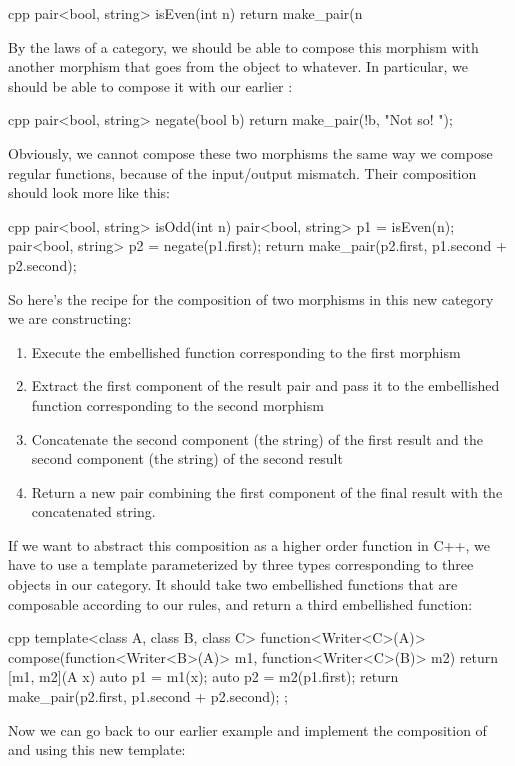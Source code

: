 \begin{snip}{cpp}
pair<bool, string> isEven(int n) {
    return make_pair(n %
}
\end{snip}
By the laws of a category, we should be able to compose this morphism
with another morphism that goes from the object  to
whatever. In particular, we should be able to compose it with our
earlier :

\begin{snip}{cpp}
pair<bool, string> negate(bool b) {
    return make_pair(!b, "Not so! ");
}
\end{snip}
Obviously, we cannot compose these two morphisms the same way we compose
regular functions, because of the input/output mismatch. Their
composition should look more like this:

\begin{snip}{cpp}
pair<bool, string> isOdd(int n) {
    pair<bool, string> p1 = isEven(n);
    pair<bool, string> p2 = negate(p1.first);
    return make_pair(p2.first, p1.second + p2.second);
}
\end{snip}
So here's the recipe for the composition of two morphisms in this new
category we are constructing:

\begin{enumerate}
  \tightlist
  \item
        Execute the embellished function corresponding to the first morphism
  \item
        Extract the first component of the result pair and pass it to the
        embellished function corresponding to the second morphism
  \item
        Concatenate the second component (the string) of the first result
        and the second component (the string) of the second result
  \item
        Return a new pair combining the first component of the final result
        with the concatenated string.
\end{enumerate}

If we want to abstract this composition as a higher order function in
C++, we have to use a template parameterized by three types
corresponding to three objects in our category. It should take two
embellished functions that are composable according to our rules, and
return a third embellished function:

\begin{snip}{cpp}
template<class A, class B, class C>
function<Writer<C>(A)> compose(function<Writer<B>(A)> m1,
                               function<Writer<C>(B)> m2)
{
    return [m1, m2](A x) {
        auto p1 = m1(x);
        auto p2 = m2(p1.first);
        return make_pair(p2.first, p1.second + p2.second); 
    };
}
\end{snip}
Now we can go back to our earlier example and implement the composition
of  and  using this new template:

